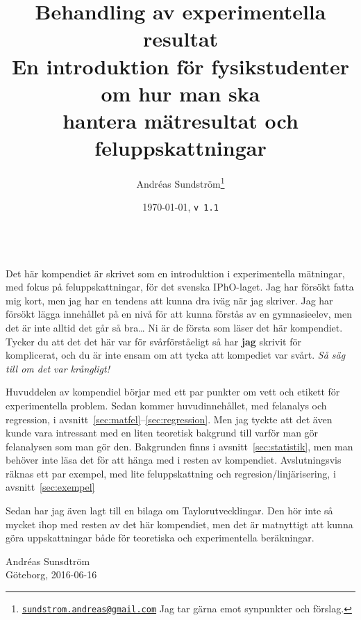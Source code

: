\documentclass[11pt,a4paper, swedish
]{article}
\newcounter{exempel_counter}%
\begin{document}
\title{\huge Behandling av experimentella resultat\\[2mm] 
\Large En introduktion för fysikstudenter om hur man ska\\ hantera
mätresultat och feluppskattningar}
\author{
Andréas Sundström\footnote{
\href{mailto:sundstrom.andreas@gmail.com}{\nolinkurl{sundstrom.andreas@gmail.com}}
\: Jag tar gärna emot synpunkter och förslag.}
}
\date{\today, \quad\texttt{v\,1.1}}
\maketitle




\\[1mm]
\small
Det här kompendiet är skrivet som en introduktion i experimentella
mätningar, med fokus på feluppskattningar, för det svenska
IPhO-laget. Jag har försökt fatta mig kort, men jag har en tendens att
kunna dra iväg när jag skriver. Jag har försökt lägga innehållet på en
nivå för att kunna förstås av en gymnasieelev, men det är inte alltid
det går så bra\ldots{} Ni är de första som läser det här
kompendiet. Tycker du att det det här var för svårförståeligt så har
\textbf{jag} skrivit för komplicerat, och du är inte ensam om att
tycka att kompediet var svårt. \emph{Så säg till om det var krångligt!} 

Huvuddelen av kompendiel börjar med ett par punkter om vett och
etikett för experimentella problem. 
Sedan kommer huvudinnehållet, med felanalys och regression, i
avsnitt~\ref{sec:matfel}--\ref{sec:regression}. 
Men jag tyckte att det även kunde vara intressant med en liten
teoretisk bakgrund till varför man gör felanalysen som man gör
den. Bakgrunden finns i avsnitt~\ref{sec:statistik}, men man behöver
inte läsa det för att hänga med i resten av kompendiet.
Avslutningsvis räknas ett par exempel, med lite feluppskattning och
regresion/linjärisering, i avsnitt~\ref{sec:exempel}

Sedan har jag även lagt till en bilaga om
Taylorutvecklingar. Den hör inte så mycket ihop med resten av det här
kompendiet, men det är matnyttigt att kunna göra uppskattningar både
för teoretiska och experimentella beräkningar. 

\begin{flushright}
Andréas Sunsdtröm\\ 
Göteborg, 2016-06-16
\end{flushright}
\normalsize
\end{document}
